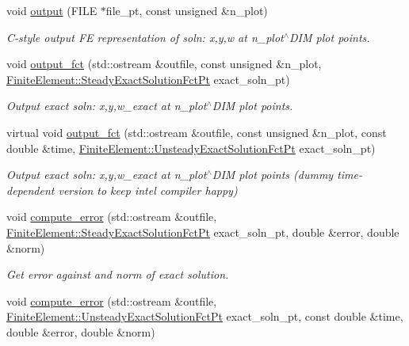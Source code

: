 \begin{DoxyCompactItemize}
void \hyperlink{classoomph_1_1FoepplvonKarmanEquations_a9972ef429bbcf53c733c6798dd68271a}{output} (F\+I\+LE $\ast$file\+\_\+pt, const unsigned \&n\+\_\+plot)
\begin{DoxyCompactList}\small\item\em C-\/style output FE representation of soln\+: x,y,w at n\+\_\+plot$^\wedge$\+D\+IM plot points. \end{DoxyCompactList}\item 
void \hyperlink{classoomph_1_1FoepplvonKarmanEquations_a2e926381021b99050cebb69a07867ebc}{output\+\_\+fct} (std\+::ostream \&outfile, const unsigned \&n\+\_\+plot, \hyperlink{classoomph_1_1FiniteElement_a690fd33af26cc3e84f39bba6d5a85202}{Finite\+Element\+::\+Steady\+Exact\+Solution\+Fct\+Pt} exact\+\_\+soln\+\_\+pt)
\begin{DoxyCompactList}\small\item\em Output exact soln\+: x,y,w\+\_\+exact at n\+\_\+plot$^\wedge$\+D\+IM plot points. \end{DoxyCompactList}\item 
virtual void \hyperlink{classoomph_1_1FoepplvonKarmanEquations_a3eecb6536ce104ef6fbf3602b306bd37}{output\+\_\+fct} (std\+::ostream \&outfile, const unsigned \&n\+\_\+plot, const double \&time, \hyperlink{classoomph_1_1FiniteElement_ad4ecf2b61b158a4b4d351a60d23c633e}{Finite\+Element\+::\+Unsteady\+Exact\+Solution\+Fct\+Pt} exact\+\_\+soln\+\_\+pt)
\begin{DoxyCompactList}\small\item\em Output exact soln\+: x,y,w\+\_\+exact at n\+\_\+plot$^\wedge$\+D\+IM plot points (dummy time-\/dependent version to keep intel compiler happy) \end{DoxyCompactList}\item 
void \hyperlink{classoomph_1_1FoepplvonKarmanEquations_a0462a804fd89f711e219f08795af6b33}{compute\+\_\+error} (std\+::ostream \&outfile, \hyperlink{classoomph_1_1FiniteElement_a690fd33af26cc3e84f39bba6d5a85202}{Finite\+Element\+::\+Steady\+Exact\+Solution\+Fct\+Pt} exact\+\_\+soln\+\_\+pt, double \&error, double \&norm)
\begin{DoxyCompactList}\small\item\em Get error against and norm of exact solution. \end{DoxyCompactList}\item 
void \hyperlink{classoomph_1_1FoepplvonKarmanEquations_ac5ba601294d66e0d1e7506cb836e7f59}{compute\+\_\+error} (std\+::ostream \&outfile, \hyperlink{classoomph_1_1FiniteElement_ad4ecf2b61b158a4b4d351a60d23c633e}{Finite\+Element\+::\+Unsteady\+Exact\+Solution\+Fct\+Pt} exact\+\_\+soln\+\_\+pt, const double \&time, double \&error, double \&norm)

\end{DoxyCompactItemize}
